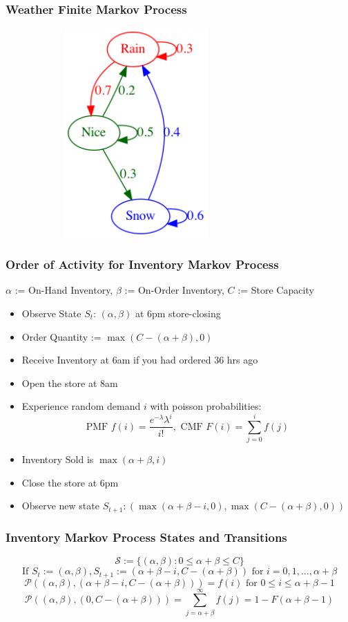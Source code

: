 \documentclass[handout]{beamer}
\begin{document}
\begin{frame}
\frametitle{Weather Finite Markov Process}
\includegraphics[width=10cm, height=8cm]{weather_mp.png}
\end{frame}


\begin{frame}
\frametitle{Order of Activity for Inventory Markov Process}
\pause
$\alpha$ := On-Hand Inventory, $\beta$ := On-Order Inventory, $C$ := Store Capacity
\pause
\begin{itemize}[<+->]
\item Observe State $S_t$: $(\alpha, \beta)$ at 6pm store-closing
\item Order Quantity := $\max(C - (\alpha + \beta), 0)$
\item Receive Inventory at 6am if you had ordered 36 hrs ago
\item Open the store at 8am
\item Experience random demand $i$ with poisson probabilities:
$$\text{PMF } f(i) = \frac {e^{-\lambda} \lambda^i} {i!}, \text{ CMF } F(i) = \sum_{j=0}^i f(j)$$
\item Inventory Sold is $\max(\alpha + \beta, i)$
\item Close the store at 6pm
\item Observe new state $S_{t+1}: (\max(\alpha + \beta - i, 0), \max(C - (\alpha + \beta), 0))$
\end{itemize}
\end{frame}

\begin{frame}
\frametitle{Inventory Markov Process States and Transitions}
\pause
$$\mathcal{S} := \{(\alpha, \beta) : 0 \leq \alpha + \beta \leq C\}$$
\pause
$$\text{If } S_t := (\alpha, \beta), S_{t+1} := (\alpha + \beta - i, C - (\alpha + \beta)) \text{ for } i =0, 1, \ldots, \alpha + \beta$$
\pause
$$\mathcal{P}((\alpha, \beta), (\alpha + \beta - i, C - (\alpha + \beta))) = f(i)\text{ for } 0 \leq i \leq \alpha + \beta - 1$$
\pause
$$\mathcal{P}((\alpha, \beta), (0, C - (\alpha + \beta))) = \sum_{j=\alpha+\beta}^{\infty} f(j) = 1 - F(\alpha + \beta - 1)$$
\end{frame}
\end{document}
